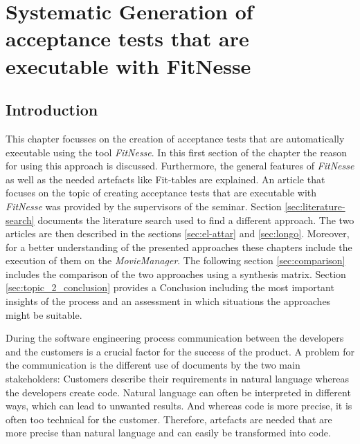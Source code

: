 

\chapter{Systematic Generation of acceptance tests that are executable with FitNesse}
\label{sec:topic_2}

\section{Introduction}\label{sec:topic_2_intro}

This chapter focusses on the creation of acceptance tests that are automatically executable using the tool \textit{FitNesse}.
In this first section of the chapter the reason for using this approach is discussed.
Furthermore, the general features of \textit{FitNesse} as well as the needed artefacts like Fit-tables are explained.
An article that focuses on the topic of creating acceptance tests that are executable with \textit{FitNesse} was provided by the supervisors of the seminar.
Section \ref{sec:literature-search} documents the literature search used to find a different approach.
The two articles are then described in the sections \ref{sec:el-attar} and \ref{sec:longo}.
Moreover, for a better understanding of the presented approaches these chapters include the execution of them on the \textit{MovieManager}.
The following section \ref{sec:comparison} includes the comparison of the two approaches using a synthesis matrix.
Section \ref{sec:topic_2_conclusion} provides a Conclusion including the most important insights of the process and an assessment in which situations the approaches might be suitable.

During the software engineering process communication between the developers and the customers is a crucial factor for the success of the product.
A problem for the communication is the different use of documents by the two main stakeholders:
Customers describe their requirements in natural language whereas the developers create code.
Natural language can often be interpreted in different ways, which can lead to unwanted results.
And whereas code is more precise, it is often too technical for the customer.
Therefore, artefacts are needed that are more precise than natural language and can easily be transformed into code.

